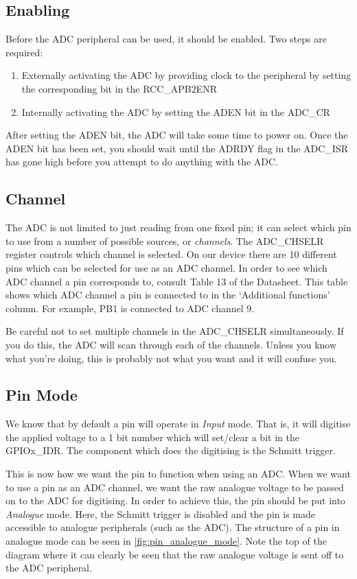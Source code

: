 \subsection{Enabling}
Before the ADC peripheral can be used, it should be enabled. Two steps are required: 
\begin{enumerate}
\item Externally activating the ADC by providing clock to the peripheral by setting the corresponding bit in the RCC\_APB2ENR
\item Internally activating the ADC by setting the ADEN bit in the ADC\_CR
\end{enumerate}

After setting the ADEN bit, the ADC will take some time to power on. Once the ADEN bit has been set, you should wait until the ADRDY flag in the ADC\_ISR has gone high before you attempt to do anything with the ADC. 

\subsection{Channel}
The ADC is not limited to just reading from one fixed pin; it can select which pin to use from a number of possible sources, or \emph{channels}.
The ADC\_CHSELR register controls which channel is selected. On our device there are 10 different pins which can be selected for use as an ADC channel. In order to see which ADC channel a pin corresponds to, consult Table 13 of the Datasheet. This table shows which ADC channel a pin is connected to in the `Additional functions' column. For example, PB1 is connected to ADC channel 9.

Be careful not to set multiple channels in the ADC\_CHSELR simultaneously. If you do this, the ADC will scan through each of the channels. Unless you know what you're doing, this is probably not what you want and it will confuse you.

\subsection{Pin Mode}
We know that by default a pin will operate in \emph{Input} mode. That is, it will digitise the applied voltage to a 1 bit number which will set/clear a bit in the GPIOx\_IDR. The component which does the digitising is the Schmitt trigger. 

This is now how we want the pin to function when using an ADC. When we want to use a pin as an ADC channel, we want the raw analogue voltage to be passed on to the ADC for digitising. In order to achieve this, the pin should be put into \emph{Analogue} mode. Here, the Schmitt trigger is disabled and the pin is made accessible to analogue peripherals (such as the ADC). The structure of a pin in analogue mode can be seen in \autoref{fig:pin_analogue_mode}. Note the top of the diagram where it can clearly be seen that the raw analogue voltage is sent off to the ADC peripheral.

